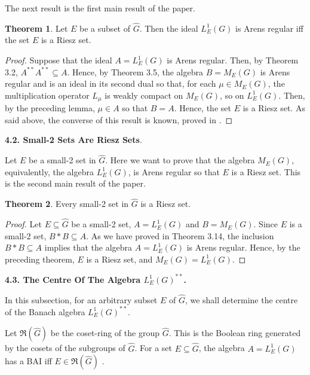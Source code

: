 \documentclass[12pt, twoside, leqno]{article}
\theoremstyle{definition}
\newtheorem{theorem}{Theorem}[section]
\theoremstyle{definition}
\numberwithin{equation}{section}
\begin{document}
The next result is the first main result of the paper.
\begin{theorem} Let $ E $ be a subset of $ \hat{G} $. Then the ideal $ L_{E}^{1}(G) $ is Arens regular iff the set $ E $ is a Riesz set.
	
\end{theorem}
\begin{proof}
	Suppose that the ideal $ A=L^{1}_{E}(G) $ is Arens regular. Then, by Theorem 3.2, $ A^{**}A^{**}\subseteq A $. Hence, by Theorem 3.5, the algebra $ B=M_{E}(G) $ is Arens regular and is an ideal in its second dual so that, for each $ \mu\in M_{E}(G) $, the multiplication operator $ L_{\mu} $ is weakly compact on $ M_{E}(G) $, so on $ L^{1}_{E}(G) $. Then, by the preceding lemma, $ \mu\in A $ so that $ B=A $. Hence, the set $ E $ is a Riesz set. As said above, the converse of this result is known, proved in \cite {a_ulger_01}.
\end{proof}
\textbf{4.2. Small-2 Sets Are Riesz Sets}.\vspace{3mm}

 Let $ E $ be a small-2 set in $ \hat{G} $. Here we want to prove that the algebra $ M_{E}(G) $, equivalently, the algebra $L^{1}_{E}(G)$, is Arens regular so that $ E $ is a Riesz set. This is the second main result of the paper.\vspace{2mm}

\begin{theorem}
	Every small-2 set in $ \hat{G} $ is a Riesz set.
\end{theorem}
\begin{proof}
	Let $ E\subseteq \hat{G} $ be a small-2 set, $ A=L^{1}_{E}(G) $  and  $ B=M_{E}(G) $. Since $ E $ is a small-2 set, $ B*B\subseteq A $. As we have proved in Theorem 3.14, the inclusion $B*B\subseteq A$ implies that the algebra $A=L^{1}_{E}(G)$ is Arens regular. Hence, by the preceding theorem, $E$ is a Riesz set, and $M_{E}(G)=L^{1}_{E}(G)$.
	
\end{proof} 

\textbf{4.3. The Centre Of The Algebra $ L_{E}^{1}(G)^{**} $.}\vspace{3mm}

In this subsection, for an arbitrary subset $ E $ of $ \hat{G} $, we shall determine the centre of the Banach algebra $ L_{E}^{1}(G)^{**} $.\vspace{2mm}

Let $ \Re(\hat{G}) $ be the coset-ring of the group $ \hat{G}  $. This is the Boolean ring generated by the cosets of the subgroups of $ \hat{G} $. For a set $ E\subseteq\hat{G} $, the algebra $ A=L^{1}_{E}(G) $ has a BAI iff $ E\in \Re(\hat{G}) $ \cite {liu_roo_wang}. \vspace{2mm}
\end{document}
